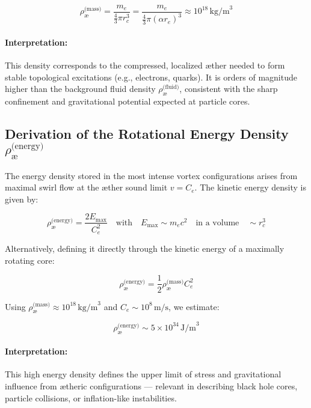 \documentclass[12pt]{article}
\begin{document}
                \[
                \rho_{\text{\ae}}^{\text{(mass)}} = \frac{m_e}{\frac{4}{3} \pi r_c^3}
                = \frac{m_e}{\frac{4}{3} \pi (\alpha r_e)^3}
                \approx 10^{18} \, \text{kg/m}^3
                \]
        
                \paragraph{Interpretation:}
                This density corresponds to the compressed, localized æther needed to form stable topological excitations (e.g., electrons, quarks). It is orders of magnitude higher than the background fluid density \( \rho_{\text{\ae}}^{\text{(fluid)}} \), consistent with the sharp confinement and gravitational potential expected at particle cores.
        
                \subsection{Derivation of the Rotational Energy Density \boldmath\( \rho_{\text{\ae}}^{\text{(energy)}} \)}
        
                The energy density stored in the most intense vortex configurations arises from maximal swirl flow at the æther sound limit \( v = C_e \). The kinetic energy density is given by:
        
                \[
                    \rho_{\text{\ae}}^{\text{(energy)}} = \frac{2 E_{\text{max}}}{C_e^2}
                    \quad \text{with} \quad
                    E_{\text{max}} \sim m_e c^2 \quad \text{in a volume} \quad \sim r_c^3
                \]
        
                Alternatively, defining it directly through the kinetic energy of a maximally rotating core:
        
                \[
                \rho_{\text{\ae}}^{\text{(energy)}} = \frac{1}{2} \rho_{\text{\ae}}^{\text{(mass)}} C_e^2
                \]
        
                Using \( \rho_{\text{\ae}}^{\text{(mass)}} \approx 10^{18} \, \text{kg/m}^3 \) and \( C_e \sim 10^8 \, \text{m/s} \), we estimate:
        
                \[
                \rho_{\text{\ae}}^{\text{(energy)}} \sim 5 \times 10^{34} \, \text{J/m}^3
                \]
        
                \paragraph{Interpretation:}
                This high energy density defines the upper limit of stress and gravitational influence from ætheric configurations — relevant in describing black hole cores, particle collisions, or inflation-like instabilities.
        
\end{document}
